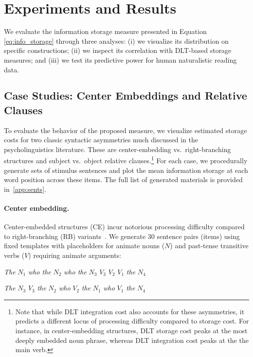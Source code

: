 \documentclass[11pt]{article}
\begin{document}
\section{Experiments and Results}

We evaluate the information storage measure presented in Equation \eqref{eq:info_storage} through three analyses: (i) we visualize its distribution on specific constructions; (ii) we inspect its correlation with DLT-based storage measures; and (iii) we test its predictive power for human naturalistic reading data.



\subsection{Case Studies: Center Embeddings and Relative Clauses}
\label{sec:illustration}

To evaluate the behavior of the proposed measure, we visualize estimated storage costs for two classic syntactic asymmetries much discussed in the psycholinguistics literature.
These are center-embedding vs.\ right-branching structures and subject vs.\ object relative clauses.\footnote{
    Note that while DLT integration cost also accounts for these asymmetries, it predicts a different locus of processing difficulty compared to storage cost. For instance, in center-embedding structures, DLT storage cost peaks at the most deeply embedded noun phrase, whereas DLT integration cost peaks at the the main verb.
}
For each case, we procedurally generate sets of stimulus sentences and plot the mean information storage at each word position across these items.
The full list of generated materials is provided in~\cref{app:sents}.

\paragraph{Center embedding.} 
Center-embedded structures (CE) incur notorious processing difficulty compared to right-branching (RB) variants~\citep{yngve-1960,miller-chomsky-1963,gibson-1998}. 
We generate 30 sentence pairs (items) using fixed templates with placeholders for animate nouns ($N$) and past-tense transitive verbs ($V$) requiring animate arguments:
\begin{description}[noitemsep]
    \item[CE] \textit{The} $N_1$ \textit{who the} $N_2$ \textit{who the} $N_3$ $V_3$ $V_2$ $V_1$ \textit{the} $N_4$
    \item[RB] \textit{The} $N_3$ $V_3$ \textit{the} $N_2$ \textit{who} $V_2$ \textit{the} $N_1$ \textit{who} $V_1$ \textit{the} $N_4$
\end{description}
\end{document}

